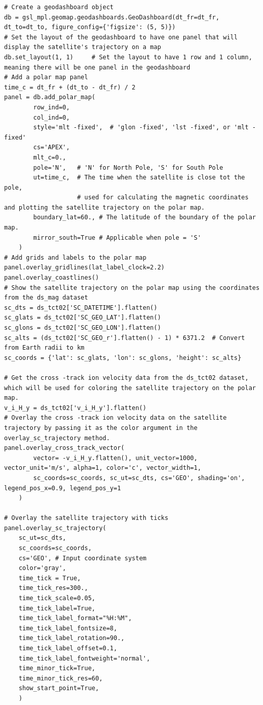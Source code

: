 \begin{verbatim}
# Create a geodashboard object
db = gsl_mpl.geomap.geodashboards.GeoDashboard(dt_fr=dt_fr, dt_to=dt_to, figure_config={'figsize': (5, 5)})
# Set the layout of the geodashboard to have one panel that will display the satellite's trajectory on a map
db.set_layout(1, 1)     # Set the layout to have 1 row and 1 column, meaning there will be one panel in the geodashboard
# Add a polar map panel
time_c = dt_fr + (dt_to - dt_fr) / 2
panel = db.add_polar_map(
        row_ind=0, 
        col_ind=0, 
        style='mlt -fixed',  # 'glon -fixed', 'lst -fixed', or 'mlt -fixed'
        cs='APEX',
        mlt_c=0., 
        pole='N',   # 'N' for North Pole, 'S' for South Pole
        ut=time_c,  # The time when the satellite is close tot the pole, 
                    # used for calculating the magnetic coordinates and plotting the satellite trajectory on the polar map.
        boundary_lat=60., # The latitude of the boundary of the polar map. 
        mirror_south=True # Applicable when pole = 'S'
    )
# Add grids and labels to the polar map
panel.overlay_gridlines(lat_label_clock=2.2)
panel.overlay_coastlines()
# Show the satellite trajectory on the polar map using the coordinates from the ds_mag dataset
sc_dts = ds_tct02['SC_DATETIME'].flatten()
sc_glats = ds_tct02['SC_GEO_LAT'].flatten()
sc_glons = ds_tct02['SC_GEO_LON'].flatten()
sc_alts = (ds_tct02['SC_GEO_r'].flatten() - 1) * 6371.2  # Convert from Earth radii to km
sc_coords = {'lat': sc_glats, 'lon': sc_glons, 'height': sc_alts}

# Get the cross -track ion velocity data from the ds_tct02 dataset, which will be used for coloring the satellite trajectory on the polar map.
v_i_H_y = ds_tct02['v_i_H_y'].flatten()
# Overlay the cross -track ion velocity data on the satellite trajectory by passing it as the color argument in the overlay_sc_trajectory method.
panel.overlay_cross_track_vector(
        vector= -v_i_H_y.flatten(), unit_vector=1000, vector_unit='m/s', alpha=1, color='c', vector_width=1, 
        sc_coords=sc_coords, sc_ut=sc_dts, cs='GEO', shading='on', legend_pos_x=0.9, legend_pos_y=1
    )

# Overlay the satellite trajectory with ticks
panel.overlay_sc_trajectory(
    sc_ut=sc_dts, 
    sc_coords=sc_coords, 
    cs='GEO', # Input coordinate system
    color='gray',
    time_tick = True, 
    time_tick_res=300., 
    time_tick_scale=0.05,
    time_tick_label=True, 
    time_tick_label_format="%H:%M", 
    time_tick_label_fontsize=8,
    time_tick_label_rotation=90., 
    time_tick_label_offset=0.1, 
    time_tick_label_fontweight='normal',
    time_minor_tick=True, 
    time_minor_tick_res=60,
    show_start_point=True,
    )
\end{verbatim}

